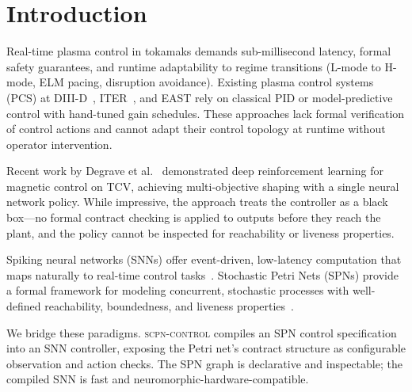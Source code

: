 \documentclass[twocolumn,preprintnumbers,amsmath,amssymb,prl,floatfix]{revtex4-2}
\begin{document}
\maketitle

\section{Introduction}
\label{sec:intro}

Real-time plasma control in tokamaks demands sub-millisecond latency,
formal safety guarantees, and runtime adaptability to regime transitions
(L-mode to H-mode, ELM pacing, disruption avoidance).
Existing plasma control systems (PCS) at DIII-D~\cite{ferron1998},
ITER~\cite{iter_codac,humphreys2015}, and EAST rely on classical PID or
model-predictive control with hand-tuned gain schedules.
These approaches lack formal verification of control actions and cannot
adapt their control topology at runtime without operator intervention.

Recent work by Degrave et al.~\cite{degrave2022} demonstrated deep
reinforcement learning for magnetic control on TCV, achieving multi-objective
shaping with a single neural network policy.  While impressive, the approach
treats the controller as a black box---no formal contract checking is
applied to outputs before they reach the plant, and the policy cannot be
inspected for reachability or liveness properties.

Spiking neural networks (SNNs) offer event-driven, low-latency
computation that maps naturally to real-time control
tasks~\cite{tavanaei2019,maass1997}.  Stochastic Petri Nets (SPNs)
provide a formal framework for modeling concurrent, stochastic processes
with well-defined reachability, boundedness, and liveness
properties~\cite{marsan1995,murata1989}.

We bridge these paradigms.  \textsc{scpn-control} compiles an SPN
control specification into an SNN controller, exposing the Petri net's
contract structure as configurable observation and action checks.
The SPN graph is declarative and inspectable;
the compiled SNN is fast and neuromorphic-hardware-compatible.
\end{document}

